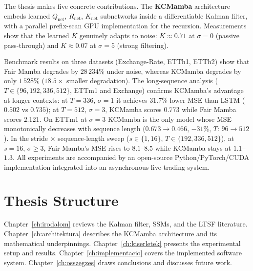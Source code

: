 The thesis makes five concrete contributions.
The \textbf{KCMamba} architecture embeds learned $Q_\text{net}$,
$R_\text{net}$, $K_\text{net}$ subnetworks inside a differentiable Kalman
filter, with a parallel prefix-scan GPU implementation for the recursion.
Measurements show that the learned $K$ genuinely adapts to noise:
$K \approx 0{.}71$ at $\sigma=0$ (passive pass-through) and
$K \approx 0{.}07$ at $\sigma=5$ (strong filtering).

Benchmark results on three datasets (Exchange-Rate, ETTh1, ETTh2) show
that Fair Mamba degrades by $28\,234\%$ under noise, whereas KCMamba
degrades by only $1\,528\%$ ($18.5\times$ smaller degradation).
The long-sequence analysis ($T \in \{96,192,336,512\}$, ETTm1 and
Exchange) confirms KCMamba's advantage at longer contexts:
at $T{=}336$, $\sigma{=}1$ it achieves $31.7\%$ lower MSE than LSTM
($0.502$ vs $0.735$); at $T{=}512$, $\sigma{=}3$, KCMamba scores $0.773$
while Fair Mamba scores $2.121$. On ETTm1 at $\sigma{=}3$ KCMamba is
the only model whose MSE monotonically decreases with sequence length
($0.673 \to 0.466$, $-31\%$, $T{:}\,96 \to 512$).
In the stride $\times$ sequence-length sweep ($s \in \{1,16\}$,
$T \in \{192,336,512\}$), at $s{=}16$, $\sigma{\geq}3$,
Fair Mamba's MSE rises to $8.1$--$8.5$ while KCMamba stays at $1.1$--$1.3$.
All experiments are accompanied by an open-source Python/PyTorch/CUDA
implementation integrated into an asynchronous live-trading system.

\section{Thesis Structure}

Chapter~\ref{ch:irodalom} reviews the Kalman filter, SSMs, and the
LTSF literature.
Chapter~\ref{ch:architektura} describes the KCMamba architecture and
its mathematical underpinnings.
Chapter~\ref{ch:kiserletek} presents the experimental setup and results.
Chapter~\ref{ch:implementacio} covers the implemented software system.
Chapter~\ref{ch:osszegzes} draws conclusions and discusses future work.
